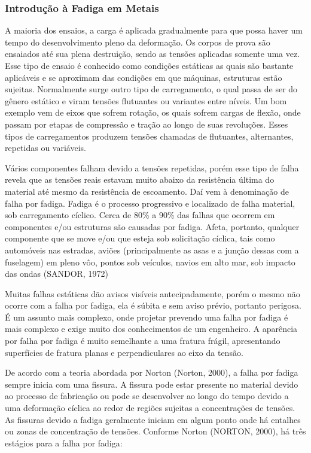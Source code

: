 \subsubsection{Introdução à Fadiga em Metais}

A maioria dos ensaios, a carga é aplicada gradualmente para que possa haver um tempo do desenvolvimento pleno da deformação. Os corpos de prova são ensaiados até sua plena destruição, sendo as tensões aplicadas somente uma vez. Esse tipo de ensaio é conhecido como condições estáticas as quais são bastante aplicáveis e se aproximam das condições em que máquinas, estruturas estão sujeitas. Normalmente surge outro tipo de carregamento, o qual passa de ser do gênero estático e viram tensões flutuantes ou variantes entre níveis. Um bom exemplo vem de eixos que sofrem rotação, os quais sofrem cargas de flexão, onde passam por etapas de compressão e tração ao longo de suas revoluções. Esses tipos de carregamentos produzem tensões chamadas de flutuantes, alternantes, repetidas ou variáveis.

Vários componentes falham devido a tensões repetidas, porém esse tipo de falha revela que as tensões reais estavam muito abaixo da resistência última do material até mesmo da resistência de escoamento. Daí vem à denominação de falha por fadiga. Fadiga é o processo progressivo e localizado de falha material, sob carregamento cíclico. Cerca de 80\% a 90\% das falhas que ocorrem em componentes e/ou estruturas são causadas por fadiga. Afeta, portanto, qualquer componente que se move e/ou que esteja sob solicitação cíclica, tais como automóveis nas estradas, aviões (principalmente as asas e a junção dessas com a fuselagem) em pleno vôo, pontos sob veículos, navios em alto mar, sob impacto das ondas (SANDOR, 1972)

Muitas falhas estáticas dão avisos visíveis antecipadamente, porém o mesmo não ocorre com a falha por fadiga, ela é súbita e sem aviso prévio, portanto perigosa. É um assunto mais complexo, onde projetar prevendo uma falha por fadiga é mais complexo e exige muito dos conhecimentos de um engenheiro. A aparência por falha por fadiga é muito semelhante a uma fratura frágil, apresentando superfícies de fratura planas e perpendiculares ao eixo da tensão.

De acordo com a teoria abordada por Norton (Norton, 2000), a falha por fadiga sempre inicia com uma fissura. A fissura pode estar presente no material devido ao processo de fabricação ou pode se desenvolver ao longo do tempo devido a uma deformação cíclica ao redor de regiões sujeitas a concentrações de tensões. As fissuras devido a fadiga geralmente iniciam em algum ponto onde há entalhes ou zonas de concentração de tensões. Conforme Norton (NORTON, 2000), há três estágios para a falha por fadiga:

